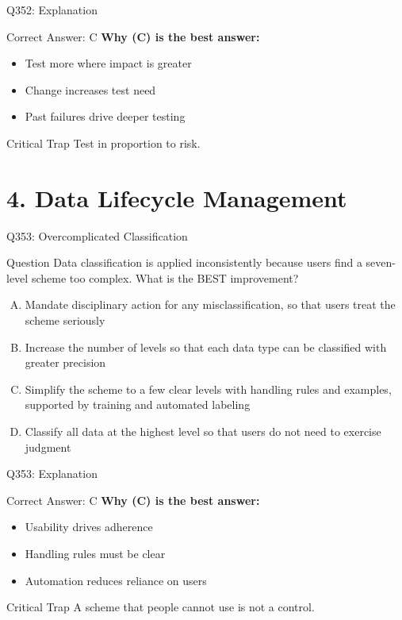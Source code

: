 \documentclass{beamer}
\begin{document}
	\begin{frame}{Q352: Explanation}
		\begin{block}{Correct Answer: C}
			\textbf{Why (C) is the best answer:}
			\begin{itemize}
				\item Test more where impact is greater
				\item Change increases test need
				\item Past failures drive deeper testing
			\end{itemize}
		\end{block}
		\begin{alertblock}{Critical Trap}
			Test in proportion to risk.
		\end{alertblock}
	\end{frame}
		
	\section{4. Data Lifecycle Management}
	
	\begin{frame}{Q353: Overcomplicated Classification}
		\begin{block}{Question}
			\small Data classification is applied inconsistently because users find a seven-level scheme too complex. What is the BEST improvement?
		\end{block}
		\begin{enumerate}[(A)]
			\footnotesize
			\item Mandate disciplinary action for any misclassification, so that users treat the scheme seriously
			\item Increase the number of levels so that each data type can be classified with greater precision
			\item Simplify the scheme to a few clear levels with handling rules and examples, supported by training and automated labeling
			\item Classify all data at the highest level so that users do not need to exercise judgment
		\end{enumerate}
	\end{frame}
	
	\begin{frame}{Q353: Explanation}
		\begin{block}{Correct Answer: C}
			\textbf{Why (C) is the best answer:}
			\begin{itemize}
				\item Usability drives adherence
				\item Handling rules must be clear
				\item Automation reduces reliance on users
			\end{itemize}
		\end{block}
		\begin{alertblock}{Critical Trap}
			A scheme that people cannot use is not a control.
		\end{alertblock}
	\end{frame}
	
\end{document}
